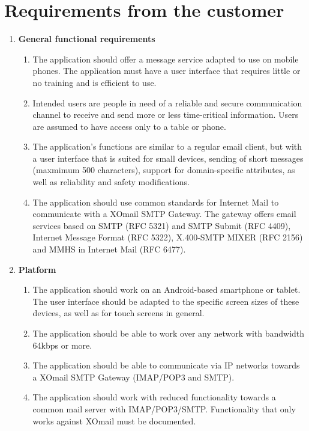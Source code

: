 

\section{Requirements from the customer}

\begin{enumerate}
\item{} \textbf{General functional requirements}
\begin{enumerate}
\item{}The application should offer a message service adapted to use on mobile phones. The application must have a user interface that requires little or no training and is efficient to use.
\item{}Intended users are people in need of a reliable and secure communication channel to receive and send more or less time-critical information. Users are assumed to have access only to a table or phone.
\item{}The application's functions are similar to a regular email client, but with a user interface that is suited for small devices, sending of short messages (maxmimum 500 characters), support for domain-specific attributes, as well as reliability and safety modifications.
\item{}The application should use common standards for Internet Mail to communicate with a XOmail SMTP Gateway. The gateway offers email services based on SMTP (RFC 5321) and SMTP Submit (RFC 4409), Internet Message Format (RFC 5322), X.400-SMTP MIXER (RFC 2156) and MMHS in Internet Mail (RFC 6477). 
\end{enumerate}
\item{}\textbf{Platform}
\begin{enumerate}
\item{}The application should work on an Android-based smartphone or tablet. The user interface should be adapted to the specific screen sizes of these devices, as well as for touch screens in general.
\item{}The application should be able to work over any network with bandwidth 64kbps or more.
\item{}The application should be able to communicate via IP networks towards a XOmail SMTP Gateway (IMAP/POP3 and SMTP).
\item{}The application should work with reduced functionality towards a common mail server with IMAP/POP3/SMTP. Functionality that only works against XOmail must be documented.
\end{enumerate}

\end{enumerate}
